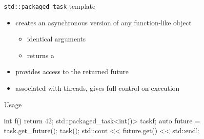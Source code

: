 \begin{frame}[fragile]
  \begin{block}{\texttt{std::packaged\_task} template}
    \begin{itemize}
    \item creates an asynchronous version of any function-like object
      \begin{itemize}
      \item identical arguments
      \item returns a 
      \end{itemize}
    \item provides access to the returned future
    \item associated with threads, gives full control on execution
    \end{itemize}
  \end{block}
  \pause
  \begin{exampleblock}{Usage}
    \begin{cppcode*}{}
      int f() { return 42; }
      std::packaged_task<int()> task{f};
      auto future = task.get_future();
      task();
      std::cout << future.get() << std::endl;
    \end{cppcode*}
  \end{exampleblock}
\end{frame}
